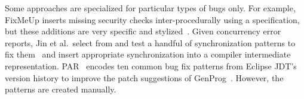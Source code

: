 Some approaches are specialized for particular types of bugs only. For example, FixMeUp inserts missing security checks inter-procedurally using a specification, but these additions are very specific and stylized~\cite{son2013fix}. Given concurrency error reports, Jin et al.~select from and test a handful of synchronization patterns to fix them~\cite{JZDLL:12} and insert appropriate synchronization into a compiler intermediate representation. PAR~\cite{Kim2013:PAR} encodes ten common bug fix patterns from Eclipse JDT's version history to improve the patch suggestions of GenProg~\cite{Weimer2009:AFP}. However, the patterns are created manually. 

